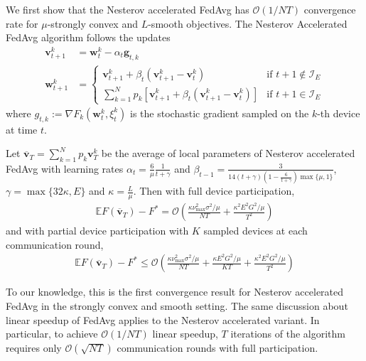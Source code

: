 We first show that the Nesterov accelerated FedAvg has $\mathcal{O}(1/NT)$
convergence rate for $\mu$-strongly convex and $L$-smooth objectives.
The Nesterov Accelerated FedAvg algorithm follows the updates
\begin{align*}
\mathbf{v}_{t+1}^{k} & =\mathbf{w}_{t}^{k}-\alpha_{t}\mathbf{g}_{t,k}\\
\mathbf{w}_{t+1}^{k} & =\begin{cases}
\mathbf{v}_{t+1}^{k}+\beta_{t}(\mathbf{v}_{t+1}^{k}-\mathbf{v}_{t}^{k}) & \text{if }t+1\notin\mathcal{I}_{E}\\
\sum_{k=1}^{N}p_{k}\left[\mathbf{v}_{t+1}^{k}+\beta_{t}(\mathbf{v}_{t+1}^{k}-\mathbf{v}_{t}^{k})\right] & \text{if }t+1\in\mathcal{I}_{E}
\end{cases}
\end{align*}
where $g_{t,k}:=\nabla F_{k}(\mathbf{w}_{t}^{k},\xi_{t}^{k})$ is
the stochastic gradient sampled on the $k$-th device at time $t$.  
\begin{theorem}
	\label{thm:nesterov_scvx}Let $\overline{\mathbf{v}}_{T}=\sum_{k=1}^{N}p_{k}\mathbf{v}_{T}^{k}$
	be the average of local parameters of Nesterov accelerated FedAvg
	with learning rates $\alpha_{t}=\frac{6}{\mu}\frac{1}{t+\gamma}$
	and $\beta_{t-1}=\frac{3}{14(t+\gamma)(1-\frac{6}{t+\gamma})\max\{\mu,1\}}$,
	$\gamma=\max\{32\kappa,E\}$ and $\kappa=\frac{L}{\mu}$. Then with
	full device participation, 
	\begin{align*}
	\mathbb{E}F(\overline{\mathbf{v}}_{T})-F^{\ast}=\mathcal{O}\left(\frac{\kappa\nu_{\max}^{2}\sigma^{2}/\mu}{NT}+\frac{\kappa^{2}E^{2}G^{2}/\mu}{T^{2}}\right)
	\end{align*}
	and with partial device participation with $K$ sampled devices at
	each communication round, 
	\begin{align*}
	\mathbb{E}F(\overline{\mathbf{v}}_{T})-F^{\ast}\leq\mathcal{O}\left(\frac{\kappa\nu_{\max}^{2}\sigma^{2}/\mu}{NT}+\frac{\kappa E^{2}G^{2}/\mu}{KT}+\frac{\kappa^{2}E^{2}G^{2}/\mu}{T^{2}}\right)
	\end{align*}
\end{theorem}
%
To our knowledge, this is the first convergence result for Nesterov
accelerated FedAvg in the strongly convex and smooth setting. The
same discussion about linear speedup of FedAvg applies to the Nesterov
accelerated variant. In particular, to achieve $\mathcal{O}(1/NT)$
linear speedup, $T$ iterations of the algorithm requires only $\mathcal{O}(\sqrt{NT})$
communication rounds with full participation. 


